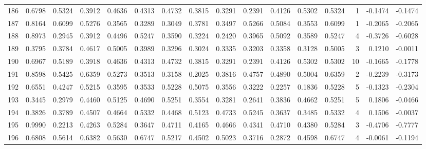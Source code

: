 \begin{tabular}{lrrrrrrrrrrrrrrr}
186 &      0.6798 &  0.5324 &  0.3912 &  0.4636 &  0.4313 &  0.4732 &  0.3815 &  0.3291 &  0.2391 &  0.4126 &   0.5302 &     0.5324 &      1 &                   -0.1474 &                    -0.1474 \\
187 &      0.8164 &  0.6099 &  0.5276 &  0.3565 &  0.3289 &  0.3049 &  0.3781 &  0.3497 &  0.5266 &  0.5084 &   0.3553 &     0.6099 &      1 &                   -0.2065 &                    -0.2065 \\
188 &      0.8973 &  0.2945 &  0.3912 &  0.4496 &  0.5247 &  0.3590 &  0.3224 &  0.2420 &  0.3965 &  0.5092 &   0.3589 &     0.5247 &      4 &                   -0.3726 &                    -0.6028 \\
189 &      0.3795 &  0.3784 &  0.4617 &  0.5005 &  0.3989 &  0.3296 &  0.3024 &  0.3335 &  0.3203 &  0.3358 &   0.3128 &     0.5005 &      3 &                    0.1210 &                    -0.0011 \\
190 &      0.6967 &  0.5189 &  0.3918 &  0.4636 &  0.4313 &  0.4732 &  0.3815 &  0.3291 &  0.2391 &  0.4126 &   0.5302 &     0.5302 &     10 &                   -0.1665 &                    -0.1778 \\
191 &      0.8598 &  0.5425 &  0.6359 &  0.5273 &  0.3513 &  0.3158 &  0.2025 &  0.3816 &  0.4757 &  0.4890 &   0.5004 &     0.6359 &      2 &                   -0.2239 &                    -0.3173 \\
192 &      0.6551 &  0.4247 &  0.5215 &  0.3595 &  0.3533 &  0.5228 &  0.5075 &  0.3556 &  0.3222 &  0.2257 &   0.1836 &     0.5228 &      5 &                   -0.1323 &                    -0.2304 \\
193 &      0.3445 &  0.2979 &  0.4460 &  0.5125 &  0.4690 &  0.5251 &  0.3554 &  0.3281 &  0.2641 &  0.3836 &   0.4662 &     0.5251 &      5 &                    0.1806 &                    -0.0466 \\
194 &      0.3826 &  0.3789 &  0.4507 &  0.4664 &  0.5332 &  0.4468 &  0.5123 &  0.4733 &  0.5245 &  0.3637 &   0.3485 &     0.5332 &      4 &                    0.1506 &                    -0.0037 \\
195 &      0.9990 &  0.2213 &  0.4263 &  0.5284 &  0.3647 &  0.4711 &  0.4165 &  0.4666 &  0.4341 &  0.4710 &   0.4380 &     0.5284 &      3 &                   -0.4706 &                    -0.7777 \\
196 &      0.6808 &  0.5614 &  0.6382 &  0.5630 &  0.6747 &  0.5217 &  0.4502 &  0.5023 &  0.3716 &  0.2872 &   0.4598 &     0.6747 &      4 &                   -0.0061 &                    -0.1194 \\

\end{tabular}
